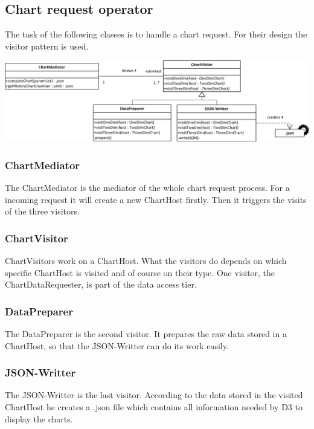 \subsection{Chart request operator}
The task of the following classes is to handle a chart request. For their design the visitor pattern
is used. 

\begin{center}
\includegraphics[width=1\linewidth]{Pictures/Parts/MediVisi.png}
\end{center}  

\subsubsection*{ChartMediator}
The ChartMediator is the mediator of the whole chart request process. For a incoming request it will create a new
ChartHost firstly. Then it triggers the visits of the three visitors. 


\subsubsection*{ChartVisitor}
ChartVisitors work on a ChartHost. What the visitors do depends on which specific ChartHost 
is visited and of course on their type. 
One visitor, the ChartDataRequester, is part of the data access tier.


\subsubsection*{DataPreparer}
The DataPreparer is the second visitor. It prepares the raw data stored in a ChartHost, so that the JSON-Writter
can do its work easily.


\subsubsection*{JSON-Writter}
The JSON-Writter is the last visitor. According to the data stored in the visited ChartHost he creates a .json file
which contains all information needed by D3 to display the charts. 

